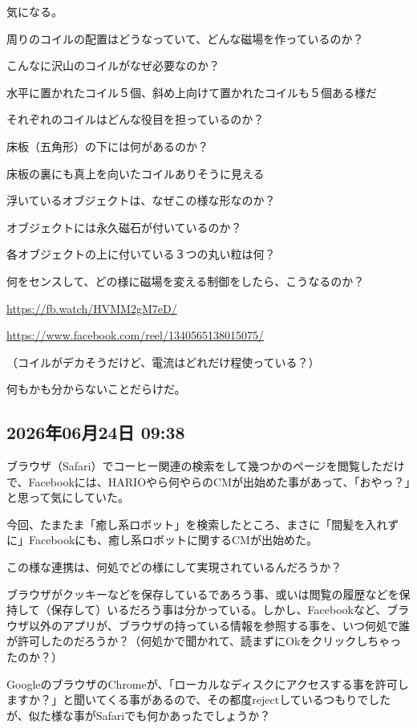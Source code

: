 \documentclass[facebook_diary.tex]{subfiles}
\begin{document}
気になる。


周りのコイルの配置はどうなっていて、どんな磁場を作っているのか？

こんなに沢山のコイルがなぜ必要なのか？

水平に置かれたコイル５個、斜め上向けて置かれたコイルも５個ある様だ

それぞれのコイルはどんな役目を担っているのか？

床板（五角形）の下には何があるのか？

床板の裏にも真上を向いたコイルありそうに見える

浮いているオブジェクトは、なぜこの様な形なのか？

オブジェクトには永久磁石が付いているのか？

各オブジェクトの上に付いている３つの丸い粒は何？

何をセンスして、どの様に磁場を変える制御をしたら、こうなるのか？


\url{https://fb.watch/HVMM2gM7eD/}



\url{https://www.facebook.com/reel/1340565138015075/}




（コイルがデカそうだけど、電流はどれだけ程使っている？）

何もかも分からないことだらけだ。

\subsection*{2026年06月24日 09:38}

ブラウザ（Safari）でコーヒー関連の検索をして幾つかのページを閲覧しただけで、Facebookには、HARIOやら何やらのCMが出始めた事があって、「おやっ？」と思って気にしていた。

今回、たまたま「癒し系ロボット」を検索したところ、まさに「間髪を入れずに」Facebookにも、癒し系ロボットに関するCMが出始めた。

この様な連携は、何処でどの様にして実現されているんだろうか？


ブラウザがクッキーなどを保存しているであろう事、或いは閲覧の履歴などを保持して（保存して）いるだろう事は分かっている。しかし、Facebookなど、ブラウザ以外のアプリが、ブラウザの持っている情報を参照する事を、いつ何処で誰が許可したのだろうか？（何処かで聞かれて、読まずにOkをクリックしちゃったのか？）

GoogleのブラウザのChromeが、「ローカルなディスクにアクセスする事を許可しますか？」と聞いてくる事があるので、その都度rejectしているつもりでしたが、似た様な事がSafariでも何かあったでしょうか？
\end{document}
